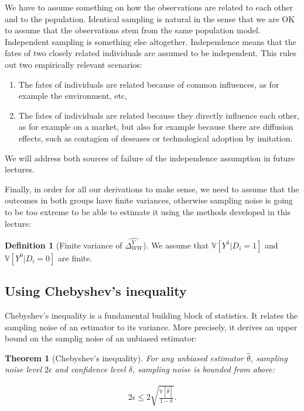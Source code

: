 \documentclass[
]{book}
\providecommand{\tightlist}{%
  \setlength{\itemsep}{0pt}\setlength{\parskip}{0pt}}
\newcommand{\var}[1]{\mathbb{V}[ #1 ]}
\newtheorem{theorem}{Theorem}[chapter]
\theoremstyle{definition}
\newtheorem{definition}{Definition}[chapter]
\theoremstyle{definition}
\theoremstyle{definition}
\theoremstyle{definition}
\theoremstyle{remark}
\begin{document}
We have to assume something on how the observations are related to each other and to the population.
Identical sampling is natural in the sense that we are OK to assume that the observations stem from the same population model.
Independent sampling is something else altogether.
Independence means that the fates of two closely related individuals are assumed to be independent.
This rules out two empirically relevant scenarios:

\begin{enumerate}
\def\labelenumi{\arabic{enumi}.}
\tightlist
\item
  The fates of individuals are related because of common influences, as for example the environment, etc,
\item
  The fates of individuals are related because they directly influence each other, as for example on a market, but also for example because there are diffusion effects, such as contagion of deseases or technological adoption by imitation.
\end{enumerate}

We will address both sources of failure of the independence assumption in future lectures.

Finally, in order for all our derivations to make sense, we need to assume that the outcomes in both groups have finite variances, otherwise sampling noise is going to be too extreme to be able to estimate it using the methods developed in this lecture:

\begin{definition}[Finite variance of $\hat{\Delta^Y_{WW}}$]
\protect\hypertarget{def:finitevar}{}{\label{def:finitevar} \iffalse (Finite variance of \(\hat{\Delta^Y_{WW}}\)) \fi{} }We assume that \(\var{Y^1|D_i=1}\) and \(\var{Y^0|D_i=0}\) are finite.
\end{definition}

\hypertarget{sec:cheb}{%
\subsection{Using Chebyshev's inequality}\label{sec:cheb}}

Chebyshev's inequality is a fundamental building block of statistics.
It relates the sampling noise of an estimator to its variance.
More precisely, it derives an upper bound on the samplig noise of an unbiased estimator:

\begin{theorem}[Chebyshev's inequality]
\protect\hypertarget{thm:cheb}{}{\label{thm:cheb} \iffalse (Chebyshev's inequality) \fi{} }For any unbiased estimator \(\hat{\theta}\), sampling noise level \(2\epsilon\) and confidence level \(\delta\), sampling noise is bounded from above:

\begin{align*}
2\epsilon \leq 2\sqrt{\frac{\var{\hat{\theta}}}{1-\delta}}.
\end{align*}
\end{theorem}
\end{document}
